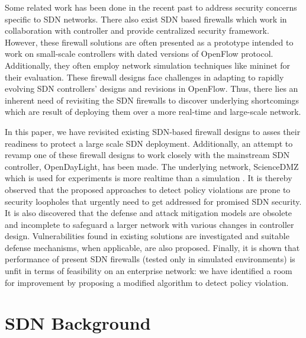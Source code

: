 Some related work has been done in the recent past to address security concerns specific to SDN networks. There also exist SDN based firewalls
which work in collaboration with controller and provide centralized security framework. However, these firewall solutions are often presented as a prototype intended to work on small-scale controllers with dated versions of OpenFlow protocol. Additionally, they often employ network simulation techniques like mininet\cite{MININET} for their evaluation. These firewall designs face challenges in adapting to rapidly evolving SDN controllers' designs and revisions in OpenFlow. Thus, there lies an inherent need of revisiting the SDN firewalls to discover underlying shortcomings which are result of deploying them over a more real-time and large-scale network.

In this paper, we have revisited existing SDN-based firewall designs to asses their readiness to protect a large scale SDN deployment. Additionally, an attempt to revamp one of these firewall designs\cite{FLOWGUARD} to work closely with the mainstream SDN controller, OpenDayLight, has been made. The underlying network, ScienceDMZ\cite{SCIENCEDMZ} which is used for experiments is more realtime than a simulation \cite{MININET}. 
It is thereby observed that the proposed approaches to detect policy violations are prone to security loopholes that urgently need to get addressed for promised SDN security. It is also discovered that the defense and attack mitigation models are obsolete and incomplete to safeguard a larger network with various changes in controller design. Vulnerabilities found in existing solutions are investigated and suitable defense mechanisms, when applicable, are also proposed. Finally, it is shown that performance of present SDN firewalls (tested only in simulated environments) is unfit in terms of feasibility on an enterprise network: we have identified a room for improvement by proposing a modified algorithm to detect policy violation. 

\section{SDN Background}
